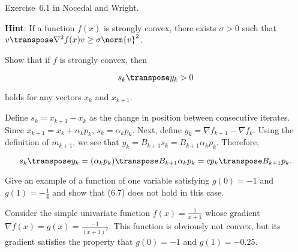 \begin{problem}\label{prob:01}%
  Exercise~6.1 in Nocedal and Wright. 
  
  
  
  \textbf{Hint}: \textnormal{If a function $f(x)$ is strongly convex, there exists $\sigma > 0$ such that $v\transpose \nabla^{2}f(x) v \geq \sigma \norm{v}^2$.}
\end{problem}

\begin{subproblem}
  Show that if $f$ is strongly convex, then
  
  \[ s_{k}\transpose y_k > 0 \]

  \vspace{-1em}
  holds for any vectors $x_k$ and $x_{k+1}$.
\end{subproblem}

Define $s_k=x_{k+1}-x_k$ as the change in position between consecutive iterates.  Since $x_{k+1}=x_k + \alpha_k p_k$, $s_k = \alpha_k p_k$.  Next, define $y_k = \nabla f_{k+1} - \nabla f_k$.  Using the definition of $m_{k+1}$, we see that $y_k = B_{k+1}s_k=B_{k+1}\alpha_k p_k$.  Therefore,

\[ s_k\transpose y_k = (\alpha_k p_k)\transpose B_{k+1} \alpha_k p_k = c p_k\transpose B_{k+1} p_k\text{.} \]


\begin{subproblem}
  Give an example of a function of one variable satisfying $g(0)=-1$ and $g(1)=-\frac{1}{4}$ and show that (6.7) does not hold in this case.
\end{subproblem}

Consider the simple univariate function $f(x) =\frac{1}{x+1}$ whose gradient $\nabla f(x) = g(x)= \frac{-1}{(x+1)^2}$.  This function is obviously not convex, but its gradient satisfies the property that $g(0)=-1$ and $g(1) = -0.25$. 


